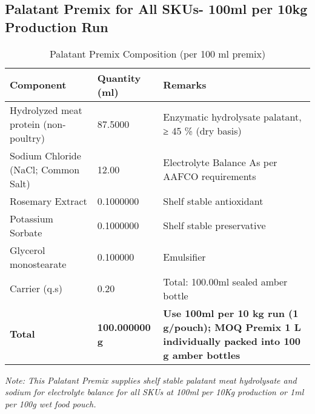 \subsection*{Palatant Premix for All SKUs- 100ml per 10kg Production Run}
\begin{table}[h]
\centering
\caption{Palatant Premix Composition (per 100 ml premix)}
\label{tab:palatant}
\begin{tabular}{@{}lll@{}}
\toprule
\textbf{Component} & \textbf{Quantity (ml)} & \textbf{Remarks} \\
\midrule

Hydrolyzed meat protein (non-poultry) & 87.5000 & Enzymatic hydrolysate palatant, ≥ 45 \% (dry basis) \\ [3pt]
Sodium Chloride (NaCl; Common Salt) & 12.00 & Electrolyte Balance  As per AAFCO requirements\\[3pt]
Rosemary Extract & 0.1000000 & Shelf stable  antioxidant \\ [3pt]
Potassium Sorbate & 0.1000000 & Shelf stable preservative \\ [3pt]
Glycerol monostearate & 0.100000 & Emulsifier \\ [3pt]
Carrier (q.s) & 0.20 & Total: 100.00ml sealed amber bottle \\[3pt]
\midrule
\textbf{Total} & \textbf{100.000000 g} & \textbf{Use 100ml  per 10 kg run (1 g/pouch); MOQ Premix 1 L individually packed into 100 g amber bottles} \\
\bottomrule
\end{tabular}
\end{table}
\noindent\textit{Note: This Palatant Premix supplies shelf stable palatant meat hydrolysate and sodium for electrolyte balance for all SKUs at 100ml per 10Kg production or 1ml per 100g wet food pouch.}
\vspace{0.5em}
